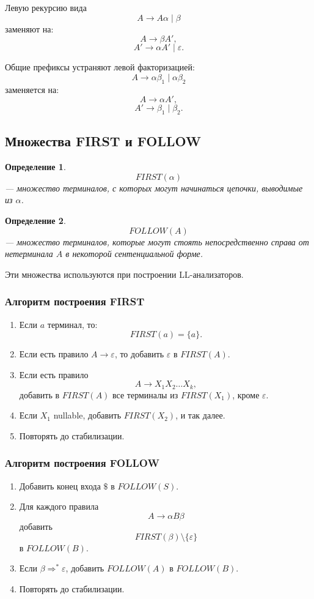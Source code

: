 \documentclass[12pt,a4paper]{article}
\newtheorem{definition}{Определение}
\newcommand{\eps}{\varepsilon}
\newcommand{\derivesstar}{\Rightarrow^{*}}
\begin{document}
Левую рекурсию вида
\[
A\to A\alpha\mid \beta
\]
заменяют на:
\[
A\to \beta A',
\]
\[
A'\to \alpha A'\mid \eps.
\]

Общие префиксы устраняют левой факторизацией:
\[
A\to \alpha\beta_1\mid \alpha\beta_2
\]
заменяется на:
\[
A\to \alpha A',
\]
\[
A'\to \beta_1\mid \beta_2.
\]

\subsection{Множества FIRST и FOLLOW}

\begin{definition}
\[
FIRST(\alpha)
\]
--- множество терминалов, с которых могут начинаться цепочки, выводимые из $\alpha$.
\end{definition}

\begin{definition}
\[
FOLLOW(A)
\]
--- множество терминалов, которые могут стоять непосредственно справа от нетерминала $A$ в некоторой сентенциальной форме.
\end{definition}

Эти множества используются при построении LL-анализаторов.

\subsubsection*{Алгоритм построения FIRST}

\begin{enumerate}
    \item Если $a$ терминал, то:
    \[
    FIRST(a)=\{a\}.
    \]
    \item Если есть правило $A\to\eps$, то добавить $\eps$ в $FIRST(A)$.
    \item Если есть правило
    \[
    A\to X_1X_2\ldots X_k,
    \]
    добавить в $FIRST(A)$ все терминалы из $FIRST(X_1)$, кроме $\eps$.
    \item Если $X_1$ nullable, добавить $FIRST(X_2)$, и так далее.
    \item Повторять до стабилизации.
\end{enumerate}

\subsubsection*{Алгоритм построения FOLLOW}

\begin{enumerate}
    \item Добавить конец входа $\$$ в $FOLLOW(S)$.
    \item Для каждого правила
    \[
    A\to \alpha B\beta
    \]
    добавить
    \[
    FIRST(\beta)\setminus\{\eps\}
    \]
    в $FOLLOW(B)$.
    \item Если $\beta\derivesstar\eps$, добавить $FOLLOW(A)$ в $FOLLOW(B)$.
    \item Повторять до стабилизации.
\end{enumerate}
\end{document}

